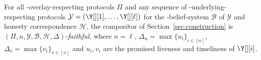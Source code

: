 \begin{conjecture}\label{conj:simulation}
  For all \rollerblade-overlay-respecting protocols $\Pi$
  and any sequence of \rollerblade-underlying-respecting
  protocols $\mathcal{Y} = (\Y[][1], \ldots, \Y[][\ell])$
  for the \rollerblade-belief-system $\mathcal{B}$ of $\mathcal{Y}$
  and honesty correspondence $\mathcal{H}$,
  the compositor \rollerblade of Section~\ref{sec:construction} is
  $(\Pi, n, \mathcal{Y}, \mathcal{B}, \mathcal{H}, \Delta)$-\emph{faithful},
  where $n = \ell$, $\Delta_u = \max\{u_i\}_{i \in [n]}$,
  $\Delta_v = \max\{v_i\}_{v \in [n]}$
  and $u_i, v_i$ are the promised liveness and timeliness of $\Y[][i]$.
\end{conjecture}
